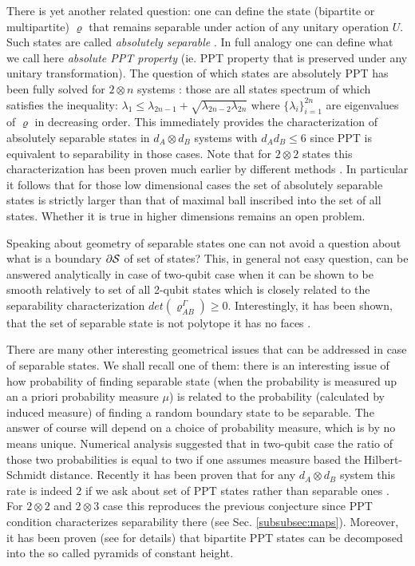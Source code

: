 \documentclass[twocolumn,aps,rmp]{revtex4}
\begin{document}
There is yet another related question: one can define the state
(bipartite or multipartite) $\varrho$ that remains separable under
action of any unitary operation $U$. Such states are called {\it
absolutely separable} \cite{2qOrbitsKus}. In full analogy one can
define what we call here {\it absolute PPT property} (ie. PPT
property that is preserved under any unitary transformation). The
question of which states are absolutely PPT has been fully solved
for $2 \otimes n$ systems \cite{AbsolutePPT}: those are all states
spectrum of which satisfies the inequality: $\lambda_{1}\leq
\lambda_{2n-1} + \sqrt{\lambda_{2n-2}\lambda_{2n}}$ where $\{
\lambda_{i} \}_{i=1}^{2n}$ are eigenvalues of $\varrho$ in
decreasing order. This immediately provides the characterization of
absolutely separable states in $d_{A} \otimes d_{B}$ systems with
$d_{A}d_{B}\leq 6$ since PPT is equivalent to separability in those
cases. Note that for $2 \otimes 2 $ states this characterization has
been proven much earlier by different methods \cite{2x2AbsoluteSep}.
In particular it follows that for those low dimensional cases the set
of absolutely separable states is strictly larger than that of
maximal ball inscribed into the set of all states. Whether it is
true in higher dimensions remains an open problem.

Speaking about geometry of separable states one can not avoid a
question about what is a boundary $\partial {\cal S}$ of set of
states? This, in general not easy question, can be answered
analytically in case of two-qubit case when it can be shown to be
smooth \cite{SmoothBoundary} relatively to set of all 2-qubit states
which is closely related to the separability characterization
\cite{Augusiak} $det(\varrho_{AB}^{\Gamma})\geq 0$.
Interestingly, it has been shown, that the set of separable state is not polytope \cite{IoannouT2006}
it has no faces \cite{GuhneL2006}.

There are many other interesting geometrical issues that can be
addressed in case of separable states. We shall recall one of them:
there is an interesting issue of how probability of finding separable
state (when the probability is measured up an a priori probability
measure $\mu$) is related to the probability (calculated by induced
measure) of finding a random boundary state to be separable. The
answer of course will depend on a choice of probability measure, which
is by no means unique.  Numerical analysis suggested
\cite{Slater1,Slater2} that in two-qubit case the ratio of those two
probabilities is equal to two if one assumes measure based the
Hilbert-Schmidt distance. Recently it has been proven that for any
$d_{A}\otimes d_{B}$ system this rate is indeed $2$ if we ask about
set of PPT states rather than separable ones
\cite{SzarekProbabilityPPTBoundary}. For $2\otimes 2$ and $2 \otimes
3$ case this reproduces the previous conjecture since PPT condition
characterizes separability there (see Sec.
\ref{subsubsec:maps}). Moreover, it has been proven (see
\cite{SzarekProbabilityPPTBoundary} for details) that bipartite PPT
states can be decomposed into the so called pyramids of constant
height.
\end{document}
